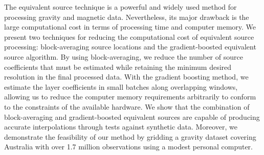 The equivalent source technique is a powerful and widely used method for
processing gravity and magnetic data.  Nevertheless, its major
drawback is the large computational cost in terms of processing time and
computer memory.
We present two techniques for reducing the computational cost of equivalent
source processing: block-averaging source locations and the
gradient-boosted equivalent source algorithm.
By using block-averaging, we reduce the number of source coefficients that
must be estimated while retaining the minimum desired resolution in the final
processed data.
With the gradient boosting method, we estimate the layer coefficients in
small batches along overlapping windows, allowing us to reduce the computer
memory requirements arbitrarily to conform to the constraints of the
available hardware.
We show that the combination of block-averaging and gradient-boosted
equivalent sources are capable of producing accurate interpolations through
tests against synthetic data.
Moreover, we demonstrate the feasibility of our method by gridding a gravity
dataset covering Australia with over 1.7 million observations using a modest
personal computer.
